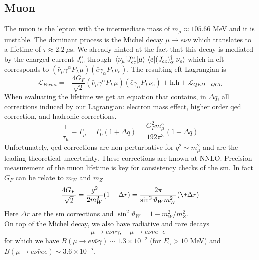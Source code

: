 \begin{refsection}
    \subsection{Muon}
        The muon is the lepton with the intermediate mass of $m_\mu \approx 105.66$ MeV and it is unstable. The dominant process is the Michel decay $\mu\rightarrow e\nu\bar{\nu}$ which translates to a lifetime of $\tau\approx2.2\ \mu$s. We already hinted at the fact that this decay is mediated by the charged current $J_{cc}^\alpha$ through $\matrixel{\nu_\mu}{J_{cc}^\alpha}{\mu}\matrixel{e}{(J_{cc})^\dag_\alpha}{\nu_e}$ which in \gls{eft} corresponds to $(\bar{\nu}_\mu\gamma^\alpha P_L\mu)(\bar{e}\gamma_\alpha P_L\nu_e)$. The resulting \gls{eft} Lagrangian is
        \begin{equation}
            \mathcal{L}_{Fermi}=-\frac{4G_F}{\sqrt{2}} (\bar{\nu}_\mu\gamma^\alpha P_L\mu)(\bar{e}\gamma_\alpha P_L\nu_e) + \text{h.h}+ \mathcal{L}_{QED+QCD}
        \end{equation}
        When evaluating the lifetime we get an equation that contains, in $\Delta q$, all corrections induced by our Lagrangian: electron mass effect, higher order \gls{qed} correction, and hadronic corrections. 
        \begin{equation}
            \frac{1}{\tau_\mu}\equiv\Gamma_\mu = \Gamma_0(1+\Delta q) = \frac{G_F^2 m_\mu^5}{192 \pi^3}(1+\Delta q)
            \label{eq:tau}
        \end{equation}
        Unfortunately, \gls{qcd} corrections are non-perturbative for $q^2\sim m_\mu^2$ and are the leading theoretical uncertainty. These corrections are known at NNLO.
        Precision measurement of the muon lifetime is key for consistency checks of the \gls{sm}. In fact $G_F$ can be relate to $m_W$ and $m_Z$
        \begin{equation}
            \frac{4G_F}{\sqrt{2}}=\frac{g^2}{2m_W^2}(1+\Delta r)=\frac{2\pi}{\sin^2\vartheta_Wm_W^2}(\+\Delta r)
        \end{equation}
        Here $\Delta r$ are the \gls{sm} corrections and $\sin^2\vartheta_W=1-m_W^2/m_Z^2$.\\
        On top of the Michel decay, we also have radiative and rare decays
        \begin{equation}
            \mu\rightarrow e\nu\bar{\nu}\gamma, \quad \mu\rightarrow e\nu\bar{\nu}e^+e^-
        \end{equation}
        for which we have $B(\mu\rightarrow e\nu\bar{\nu}\gamma)\sim 1.3\times 10^{-2}$ (for $E_\gamma>10$ MeV) and $B(\mu\rightarrow e\nu\bar{\nu}ee)\sim 3.6 \times 10^{-5}$.

\end{refsection}
